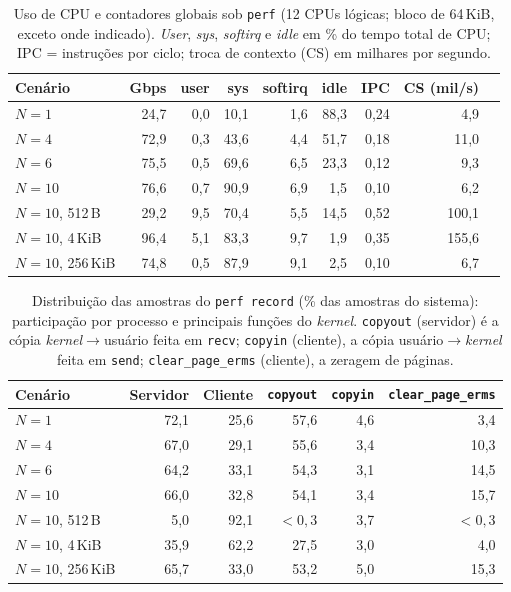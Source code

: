 \documentclass[12pt,a4paper]{article}
\newcommand{\SI}[2]{\mbox{#1\,#2}}
\begin{document}
\begin{table}[H]
\centering
\caption{Uso de CPU e contadores globais sob \texttt{perf} (12 CPUs lógicas;
bloco de \SI{64}{KiB}, exceto onde indicado). \textit{User}, \textit{sys},
\textit{softirq} e \textit{idle} em \% do tempo total de CPU; IPC =
instruções por ciclo; troca de contexto (CS) em milhares por segundo.}
\label{tab:perf}
\small
\begin{tabular}{lrrrrrrrr}
\toprule
Cenário & Gbps & user & sys & softirq & idle & IPC & CS (mil/s) \\
\midrule
$N=1$            & 24,7 & 0,0 & 10,1 & 1,6 & 88,3 & 0,24 & 4,9\\
$N=4$            & 72,9 & 0,3 & 43,6 & 4,4 & 51,7 & 0,18 & 11,0\\
$N=6$            & 75,5 & 0,5 & 69,6 & 6,5 & 23,3 & 0,12 & 9,3\\
$N=10$           & 76,6 & 0,7 & 90,9 & 6,9 & 1,5  & 0,10 & 6,2\\
$N=10$, 512\,B   & 29,2 & 9,5 & 70,4 & 5,5 & 14,5 & 0,52 & 100,1\\
$N=10$, 4\,KiB   & 96,4 & 5,1 & 83,3 & 9,7 & 1,9  & 0,35 & 155,6\\
$N=10$, 256\,KiB & 74,8 & 0,5 & 87,9 & 9,1 & 2,5  & 0,10 & 6,7\\
\bottomrule
\end{tabular}
\end{table}

\begin{table}[H]
\centering
\caption{Distribuição das amostras do \texttt{perf record} (\% das amostras do
sistema): participação por processo e principais funções do \textit{kernel}.
\texttt{copyout} (servidor) é a cópia \textit{kernel}$\to$usuário feita em
\texttt{recv}; \texttt{copyin} (cliente), a cópia usuário$\to$\textit{kernel}
feita em \texttt{send}; \texttt{clear\_page\_erms} (cliente), a
zeragem de páginas.}
\label{tab:perfsym}
\small
\begin{tabular}{lrrrrr}
\toprule
Cenário & Servidor & Cliente & \texttt{copyout} & \texttt{copyin} & \texttt{clear\_page\_erms}\\
\midrule
$N=1$            & 72,1 & 25,6 & 57,6 & 4,6 & 3,4\\
$N=4$            & 67,0 & 29,1 & 55,6 & 3,4 & 10,3\\
$N=6$            & 64,2 & 33,1 & 54,3 & 3,1 & 14,5\\
$N=10$           & 66,0 & 32,8 & 54,1 & 3,4 & 15,7\\
$N=10$, 512\,B   & 5,0  & 92,1 & $<0{,}3$ & 3,7 & $<0{,}3$\\
$N=10$, 4\,KiB   & 35,9 & 62,2 & 27,5 & 3,0 & 4,0\\
$N=10$, 256\,KiB & 65,7 & 33,0 & 53,2 & 5,0 & 15,3\\
\bottomrule
\end{tabular}
\end{table}
\end{document}
